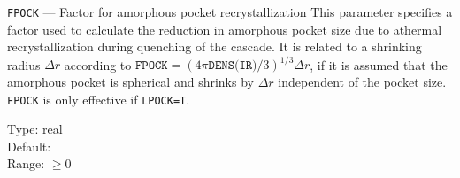 \begin{keydescription}{\texttt{FPOCK} --- Factor for amorphous pocket 
    recrystallization}
%
  This parameter specifies a factor used to calculate the reduction in
  amorphous pocket size due to athermal recrystallization during quenching of 
  the cascade.  It is related to a shrinking radius $\Delta r$ according to 
  $\texttt{FPOCK} = (4 \pi \texttt{DENS(IR)} / 3) ^ {1/3} \Delta r$, if it is 
  assumed that the amorphous pocket is spherical and shrinks by $\Delta r$
  independent of the pocket size.  \texttt{FPOCK} is only effective if
  \texttt{LPOCK=T}.

  \begin{keytab} 
     Type:    \> real \\ 
     Default:  \\ 
     Range:   \> $\ge 0$
  \end{keytab}
\end{keydescription}

\iffalse           %
\begin{keydescription}{\texttt{FRAC110} --- Split $\langle 110 \rangle$
    interstitial fraction}
%
  This parameter specifies the fraction of split $\langle 110 \rangle$
  interstitials among the interstitials. The fraction of split
  $\langle 110 \rangle$ interstitials among all displaced atoms is
  \texttt{FRAC110*FRACI}. The ramaining fraction \texttt{1-FRAC110} of
  interstitials is assumed at tetrahedral interstitial lattice sites
  during damage consideration in the crystalline layer.
  \begin{keytab}
    Type:    \> real \\
    Default: \> 0 \\
    Range:   \> $0 \le \texttt{FRAC110} \le 1$
  \end{keytab}
\end{keydescription}
\fi

\iffalse %
\begin{keydescription}{\texttt{FRACI} --- Interstitial fraction}
%
  This parameter specifies the fraction of interstitials among the
  displaced atoms. The interstitials are assumed at tetrahedral
  interstitial lattice sites during damage consideration in the
  crystalline layer, or they are assumed to be split $\langle 110
  \rangle$ interstitials (see \texttt{FRAC110}). All other displaced
  atoms are assumed at random locations (``amorphous'' atoms, see also
  \texttt{LAMO2}).
  \begin{keytab}
    Type:    \> real \\
    Default: \> 0 \\
    Range:   \> $0 \le \texttt{FRACI} \le 1$
  \end{keytab}
\end{keydescription}
\fi


